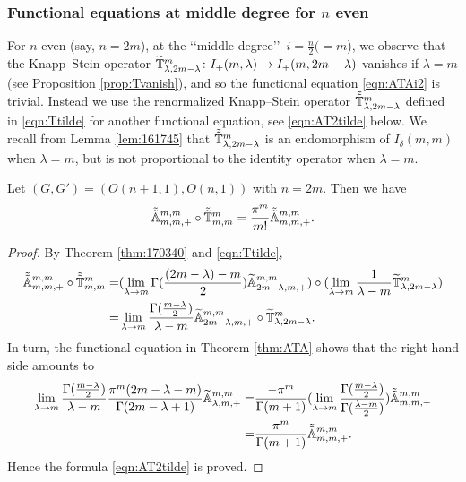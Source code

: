 \subsubsection{Functional equations at middle degree for $n$ even}

For $n$ even (say, $n=2m$), 
 at the \lq\lq{middle degree}\rq\rq\ $i=\frac n 2( =m$), 
 we observe
 that the Knapp--Stein operator
$\widetilde{{\mathbb{T}}}_{{\lambda},{2m-\lambda}}^{{m}} \colon I_+(m,\lambda) \to I_+(m,2m-\lambda)$
 vanishes 
 if $\lambda =m$
 (see Proposition \ref{prop:Tvanish}), 
 and so the functional equation \eqref{eqn:ATAi2} is trivial.  
Instead we use the
 renormalized  Knapp--Stein operator
 $\tilde{\tilde{{\mathbb{T}}}}_{{\lambda},{2m-\lambda}}^{{m}}$
 defined in  \eqref{eqn:Ttilde}
 for another functional equation, 
 see \eqref{eqn:AT2tilde} below.  
We recall from Lemma \ref{lem:161745}
 that $\tilde{\tilde{{\mathbb{T}}}}_{{\lambda},{2m-\lambda}}^{{m}}$ is an endomorphism
 of $I_{\delta}(m,m)$ 
 when $\lambda=m$, 
 but is not proportional
 to the identity operator
 when $\lambda=m$.  

\begin{lemma}
\label{lem:AmmT}
Let $(G,G')=(O(n+1,1),O(n,1))$ with $n=2m$.  
Then we have
\begin{equation}
\label{eqn:AT2tilde}
\tilde{\tilde{{\mathbb{A}}}}_{{m},{m},{+}}^{{m, m}}
\circ
\tilde{\tilde{{\mathbb{T}}}}_{{m},{m}}^{{m}}
=
\frac{\pi^m}{m!} 
\tilde{\tilde{{\mathbb{A}}}}_{{m},{m},{+}}^{{m, m}}.  
\end{equation}
\end{lemma}



\begin{proof}
By Theorem \ref{thm:170340} and \eqref{eqn:Ttilde}, 
\begin{align}
\tilde{\tilde{{\mathbb{A}}}}_{{m},{m},{+}}^{{m, m}}
\circ
\tilde{\tilde{{\mathbb{T}}}}_{{m},{m}}^{{m}}
=&
(\lim_{\lambda \to m}
  \Gamma(\frac{(2m-\lambda)-m}{2})
  {\widetilde{\mathbb{A}}}_{{2m-\lambda},{m},{+}}^{{m, m}})
\circ
(\lim_{\lambda \to m}
  \frac{1}{\lambda - m}
   \widetilde{{\mathbb{T}}}_{{\lambda},{2m-\lambda}}^{{m}})
\notag
\\
=&
\lim_{\lambda \to m}
  \frac{\Gamma(\frac{m-\lambda}{2})}
       {\lambda-m}
  {\widetilde{\mathbb{A}}}_{{2m-\lambda},{m},{+}}^{{m, m}}
  \circ
  \widetilde{{\mathbb{T}}}_{{\lambda},{2m-\lambda}}^{{m}}.  
\notag
\end{align}
In turn, the functional equation
 in Theorem \ref{thm:ATA} shows that 
 the right-hand side amounts to
\begin{align}
\lim_{\lambda \to m}
  \frac{\Gamma(\frac{m-\lambda}{2})}
       {\lambda-m}
  \frac{\pi^{m} (2m-\lambda-m)}{\Gamma(2m-\lambda+1)}
  {\widetilde{\mathbb{A}}}_{{\lambda},{m},{+}}^{{m, m}}
=&
 \frac{-\pi^{m}}{\Gamma(m+1)}
 (\lim_{\lambda \to m} 
  \frac{\Gamma(\frac{m - \lambda}{2})}{\Gamma(\frac{\lambda-m}{2})})\tilde{\tilde{{\mathbb{A}}}}_{{m},{m},{+}}^{{m, m}}
\notag
\\
=&
 \frac{\pi^{m}}{\Gamma(m+1)}
 \tilde{\tilde{{\mathbb{A}}}}_{{m},{m},{+}}^{{m, m}}.  
\end{align}
Hence the formula \eqref{eqn:AT2tilde} is proved.  
\end{proof}

